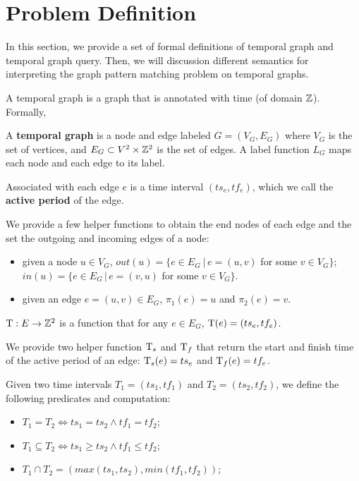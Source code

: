 \section{Problem Definition}

In this section, we provide a set of formal definitions of temporal graph and
temporal graph query. Then, we will discussion different semantics for
interpreting the graph pattern matching problem on temporal graphs.

A temporal graph is a graph that is annotated with time (of domain
$\mathbb{Z}$). Formally,

\begin{defn}
  A \textbf{temporal graph} is a node and edge labeled $G = (V_G,E_G)$ where
  $V_G$ is the set of vertices, and $E_G \subset V^2\times \mathbb{Z}^2$ is the set of
  edges. A label function $L_G$ maps each node and each edge to its label.
  
  Associated with each edge $e$ is  a time interval $(ts_e, tf_e)$, which 
  we call the {\bf active period} of the edge. 
\end{defn}

  We provide a few helper functions to obtain the end nodes of each edge and the
  set the outgoing and incoming edges of a node:
  \begin{itemize}
  	\item given a node $u \in V_G$, $out(u) = \{e \in E_G \ | \,e = (u,v)$
          for some $v \in V_G\}$; $in(u) = \{e \in E_G \,|\, e = (v,u)$ for some
          $v \in V_G\}$.
	\item given an edge $e = (u,v) \in E_G$, $\pi_1(e) = u$ and $\pi_2(e) =
          v$.
  \end{itemize}
  
   $\text{T} : E \to \mathbb{Z}^2$ is a function that for any $e \in E_G$, $\text{T}(e) = (ts_e,
  tf_e)$.

  We provide two helper function $\text{T}_s$ and $\text{T}_f$ that return the start and
  finish time of the active period of an edge: $\text{T}_s(e) = ts_e$ and $\text{T}_f(e) =
  tf_e$.
  
  Given two time intervals $T_1=(ts_1, tf_1)$ and $T_2 =(ts_2, tf_2)$, we define
  the following predicates and computation:
  \begin{itemize}
  	\item  $T_1 = T_2 \Leftrightarrow ts_1 = ts_2 \wedge tf_1 = tf_2$;
	\item $T_1 \subseteq T_2 \Leftrightarrow ts_1 \ge ts_2 \wedge tf_1 \le tf_2$;  
 	\item $T_1 \cap T_2 = (max(ts_1, ts_2), min(tf_1, tf_2))$;
\end{itemize}

